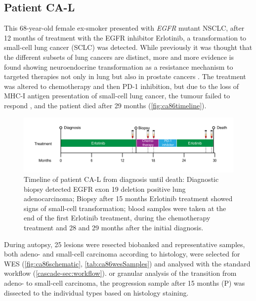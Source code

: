 \cleardoublepage


\subsection{Patient CA-L}
\label{cascade-sec:CA86}

This 68-year-old female ex-smoker presented with \textit{EGFR} mutant NSCLC, after 12 months of  treatment with the EGFR inhibitor Erlotinib, a transformation to small-cell lung cancer (SCLC) was detected. While previously it was thought that the different subsets of lung cancers are distinct, more and more evidence is found showing neuroendocrine transformation as a resistance mechanism to targeted therapies not only in lung but also in prostate cancers \cite{Oser2015,Aggarwal2018}. The treatment was altered to chemotherapy and then PD-1 inhibition, but due to the loss of MHC-I antigen presentation of small-cell lung cancer, the tumour failed to respond \cite{Burr2019}, and the patient died after 29 months (\autoref{fig:ca86timeline}).

\begin{figure}[ht]
\centering
\includegraphics[width=.99\linewidth]{Figures/CASCADE/CA86/CA-L_timeline}
\caption[Timeline of patient CA-L from diagnosis until death]{Timeline of patient CA-L from diagnosis until death: Diagnostic biopsy detected EGFR exon 19 deletion positive lung adenocarcinoma;  Biopsy after 15 months Erlotinib treatment showed signs of small-cell transformation; blood samples were taken at the end of the first Erlotinib treatment, during the chemotherapy treatment and 28 and 29 months after the initial diagnosis.} \label{fig:ca86timeline}
\end{figure}

During  autopsy, 25 lesions were resected biobanked and representative samples, both adeno- and small-cell carcinoma according to histology, were selected for WES (\autoref{fig:ca86schematic}, \autoref{tab:ca86wesSamples}) and analysed with the standard workflow (\autoref{cascade-sec:workflow}). or  granular analysis of the transition from adeno- to small-cell carcinoma, the progression sample after 15 months (P) was dissected to the individual types based on histology staining.


